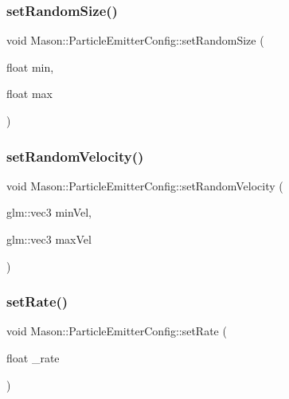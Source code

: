 \subsubsection{\texorpdfstring{set\+Random\+Size()}{setRandomSize()}}
{\footnotesize\ttfamily void Mason\+::\+Particle\+Emitter\+Config\+::set\+Random\+Size (\begin{DoxyParamCaption}\item[{float}]{min,  }\item[{float}]{max }\end{DoxyParamCaption})\hspace{0.3cm}{\ttfamily [inline]}}

\hypertarget{struct_mason_1_1_particle_emitter_config_a9102ce5287cd4c13e89f5e695563076f}{}\label{struct_mason_1_1_particle_emitter_config_a9102ce5287cd4c13e89f5e695563076f} 
\subsubsection{\texorpdfstring{set\+Random\+Velocity()}{setRandomVelocity()}}
{\footnotesize\ttfamily void Mason\+::\+Particle\+Emitter\+Config\+::set\+Random\+Velocity (\begin{DoxyParamCaption}\item[{glm\+::vec3}]{min\+Vel,  }\item[{glm\+::vec3}]{max\+Vel }\end{DoxyParamCaption})\hspace{0.3cm}{\ttfamily [inline]}}

\hypertarget{struct_mason_1_1_particle_emitter_config_a8569c3e45131fd9d51687bbf293e3154}{}\label{struct_mason_1_1_particle_emitter_config_a8569c3e45131fd9d51687bbf293e3154} 
\subsubsection{\texorpdfstring{set\+Rate()}{setRate()}}
{\footnotesize\ttfamily void Mason\+::\+Particle\+Emitter\+Config\+::set\+Rate (\begin{DoxyParamCaption}\item[{float}]{\+\_\+rate }\end{DoxyParamCaption})\hspace{0.3cm}{\ttfamily [inline]}}

